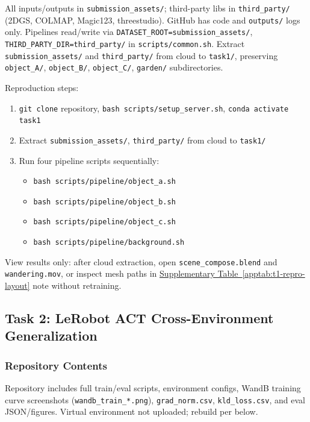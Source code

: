 \documentclass[10pt,twocolumn,letterpaper]{article}
\newcounter{apptab}
\newcommand{\apptabref}[1]{\hyperref[#1]{Supplementary Table~\ref*{#1}}}
\begin{document}
All inputs/outputs in \texttt{submission\_assets/}; third-party libs in \texttt{third\_party/} (2DGS, COLMAP, Magic123, threestudio). GitHub has code and \texttt{outputs/} logs only. Pipelines read/write via \texttt{DATASET\_ROOT=submission\_assets/}, \texttt{THIRD\_PARTY\_DIR=third\_party/} in \texttt{scripts/common.sh}. Extract \texttt{submission\_assets/} and \texttt{third\_party/} from cloud to \texttt{task1/}, preserving \texttt{object\_A/}, \texttt{object\_B/}, \texttt{object\_C/}, \texttt{garden/} subdirectories.

Reproduction steps:
\begin{enumerate}
  \item \texttt{git clone} repository, \texttt{bash scripts/setup\_server.sh}, \texttt{conda activate task1}
  \item Extract \texttt{submission\_assets/}, \texttt{third\_party/} from cloud to \texttt{task1/}
  \item Run four pipeline scripts sequentially:
  \begin{itemize}[nosep,leftmargin=*]
    \item \texttt{bash scripts/pipeline/object\_a.sh}
    \item \texttt{bash scripts/pipeline/object\_b.sh}
    \item \texttt{bash scripts/pipeline/object\_c.sh}
    \item \texttt{bash scripts/pipeline/background.sh}
  \end{itemize}
\end{enumerate}

View results only: after cloud extraction, open \texttt{scene\_compose.blend} and \texttt{wandering.mov}, or inspect mesh paths in \apptabref{apptab:t1-repro-layout} note without retraining.

\subsection{Task 2: LeRobot ACT Cross-Environment Generalization}
\label{sec:repro}

\subsubsection{Repository Contents}

Repository includes full train/eval scripts, environment configs, WandB training curve screenshots (\texttt{wandb\_train\_*.png}), \texttt{grad\_norm.csv}, \texttt{kld\_loss.csv}, and eval JSON/figures. Virtual environment not uploaded; rebuild per below.
\end{document}
